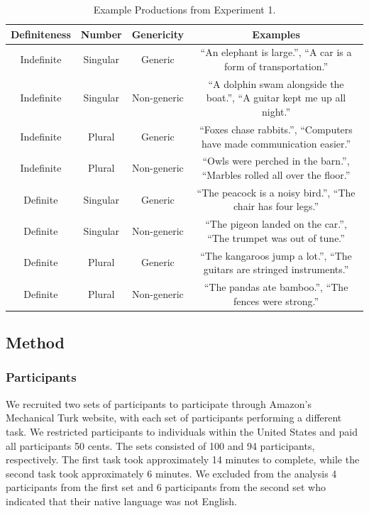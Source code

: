 \documentclass[10pt,letterpaper]{article}
\begin{document}
\begin{table}
\begin{center} 
\caption{Example Productions from Experiment 1.} 
\label{tab:ex} 
\vskip 0.12in
\begin{tabular}{cccc} 
\hline
Definiteness    &  Number & Genericity & Examples \\
\hline
Indefinite        &   Singular & Generic & ``An elephant is large.'', ``A car is a form of transportation.''\\
Indefinite  &   Singular & Non-generic & ``A dolphin swam alongside the boat.'', ``A guitar kept me up all night.''\\
Indefinite           &   Plural & Generic & ``Foxes chase rabbits.'', ``Computers have made communication easier.''\\
Indefinite         &   Plural  & Non-generic & ``Owls were perched in the barn.'', ``Marbles rolled all over the floor.''\\
Definite        &   Singular & Generic & ``The peacock is a noisy bird.'', ``The chair has four legs.''  \\
Definite  &   Singular & Non-generic & ``The pigeon landed on the car.'', ``The trumpet was out of tune.''\\
Definite           &   Plural & Generic & ``The kangaroos jump a lot.'', ``The guitars are stringed instruments.'' \\
Definite         &   Plural & Non-generic & ``The pandas ate bamboo.'', ``The fences were strong.''\\
\hline
\end{tabular} 
\end{center} 
\end{table}

\subsection{Method}

\subsubsection{Participants} 

We recruited two sets of participants to participate through Amazon's Mechanical Turk website, with each set of participants performing a different task. We restricted participants to individuals within the United States and paid all participants 50 cents. The sets consisted of 100 and 94 participants, respectively. The first task took approximately 14 minutes to complete, while the second task took approximately 6 minutes. We excluded from the analysis 4 participants from the first set and 6 participants from the second set who indicated that their native language was not English.
\end{document}
